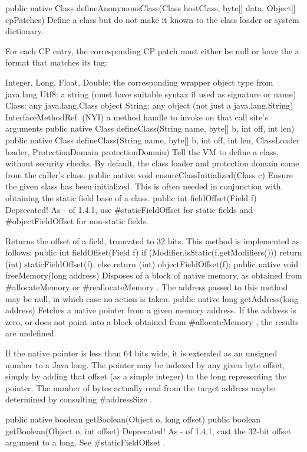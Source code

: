  public native Class defineAnonymousClass(Class hostClass,
    byte[] data,
    Object[] cpPatches)
Define a class but do not make it known to the class loader or system dictionary.

For each CP entry, the corresponding CP patch must either be null or have
the a format that matches its tag:


Integer, Long, Float, Double: the corresponding wrapper object type from java.lang
Utf8: a string (must have suitable syntax if used as signature or name)
Class: any java.lang.Class object
String: any object (not just a java.lang.String)
InterfaceMethodRef: (NYI) a method handle to invoke on that call site's arguments
 public native Class defineClass(String name,
    byte[] b,
    int off,
    int len)
 public native Class defineClass(String name,
    byte[] b,
    int off,
    int len,
    ClassLoader loader,
    ProtectionDomain protectionDomain)
Tell the VM to define a class, without security checks.  By default, the
class loader and protection domain come from the caller's class.
 public native  void ensureClassInitialized(Class c)
Ensure the given class has been initialized. This is often
needed in conjunction with obtaining the static field base of a
class.
 public int fieldOffset(Field f) 
Deprecated! As - of 1.4.1, use #staticFieldOffset for static fields and #objectFieldOffset for non-static fields.

Returns the offset of a field, truncated to 32 bits. This method is implemented as follows:
public int fieldOffset(Field f) {
    if (Modifier.isStatic(f.getModifiers()))
        return (int) staticFieldOffset(f);
    else
        return (int) objectFieldOffset(f);
}
 public native  void freeMemory(long address)
Disposes of a block of native memory, as obtained from #allocateMemory  or #reallocateMemory .  The address passed to
this method may be null, in which case no action is taken.
 public native long getAddress(long address)
Fetches a native pointer from a given memory address.  If the address is
zero, or does not point into a block obtained from #allocateMemory , the results are undefined.

 If the native pointer is less than 64 bits wide, it is extended as
an unsigned number to a Java long.  The pointer may be indexed by any
given byte offset, simply by adding that offset (as a simple integer) to
the long representing the pointer.  The number of bytes actually read
from the target address maybe determined by consulting #addressSize .

 public native boolean getBoolean(Object o,
    long offset)
 public boolean getBoolean(Object o,
    int offset) 
Deprecated! As - of 1.4.1, cast the 32-bit offset argument to a long. See #staticFieldOffset .

